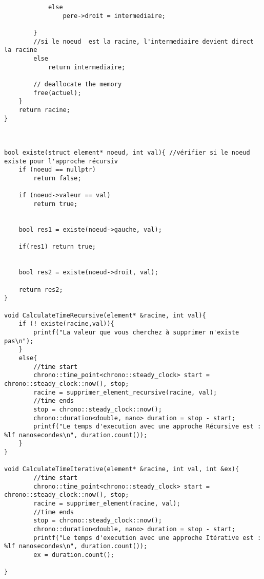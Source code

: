 \begin{verbatim}
            else 
                pere->droit = intermediaire;
            
        }
        //si le noeud  est la racine, l'intermediaire devient direct la racine
        else 
            return intermediaire;
        
        // deallocate the memory
        free(actuel);
    }
    return racine;
}



bool existe(struct element* noeud, int val){ //vérifier si le noeud existe pour l'approche récursiv
    if (noeud == nullptr)
        return false;
 
    if (noeud->valeur == val)
        return true;
 
    
    bool res1 = existe(noeud->gauche, val);
    
    if(res1) return true;
 
    
    bool res2 = existe(noeud->droit, val);
 
    return res2;
}

void CalculateTimeRecursive(element* &racine, int val){
    if (! existe(racine,val)){
        printf("La valeur que vous cherchez à supprimer n'existe pas\n");
    } 
    else{
        //time start
        chrono::time_point<chrono::steady_clock> start = chrono::steady_clock::now(), stop;
        racine = supprimer_element_recursive(racine, val);
        //time ends
        stop = chrono::steady_clock::now();
        chrono::duration<double, nano> duration = stop - start;
        printf("Le temps d'execution avec une approche Récursive est : %lf nanosecondes\n", duration.count());
    }
}

void CalculateTimeIterative(element* &racine, int val, int &ex){
        //time start
        chrono::time_point<chrono::steady_clock> start = chrono::steady_clock::now(), stop;
        racine = supprimer_element(racine, val);
        //time ends
        stop = chrono::steady_clock::now();
        chrono::duration<double, nano> duration = stop - start;
        printf("Le temps d'execution avec une approche Itérative est : %lf nanosecondes\n", duration.count());
	    ex = duration.count();

}
\end{verbatim}
